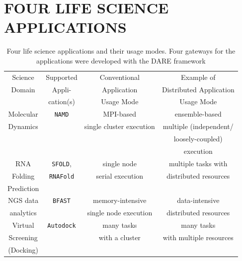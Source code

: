 \documentclass{sig-alternate}
\begin{document}
\section{FOUR LIFE SCIENCE APPLICATIONS}

\begin{table}
\small
\begin{tabular}{|c|c|c|c|} 
  \hline Science  & Supported  & Conventional   & Example of  
  \\
  Domain & Appli- & Application & Distributed Application \\ 
  &  cation(s) & Usage Mode & Usage Mode \\  \hline \hline 
  
  Molecular   &  \texttt{NAMD} &  MPI-based  & ensemble-based   \\
   Dynamics  &  & single cluster execution & multiple (independent/ \\ 
   &  &  &  loosely-coupled)  \\ 
   &  &  &  execution \\ \hline
  RNA   & \texttt{SFOLD}, & single node   & multiple tasks with \\
  Folding   & \texttt{RNAFold} & serial execution &   distributed resources \\
  Prediction & &  & \\ \hline
  NGS data     &  \texttt{BFAST} & memory-intensive  & data-intensive\\ 
     analytics  &  &  single node execution   &  distributed resources \\ \hline
  Virtual  & \texttt{Autodock} &  many tasks   & many tasks \\
   Screening  &  & with a cluster  & with multiple resources \\
  (Docking) &  &  & \\ \hline

\hline
\end{tabular} \caption{Four life science applications and their usage modes.  Four gateways for the applications were developed with the DARE framework}
 \label{table:four-applications} 
\end{table}

% 
% 
\end{document}
